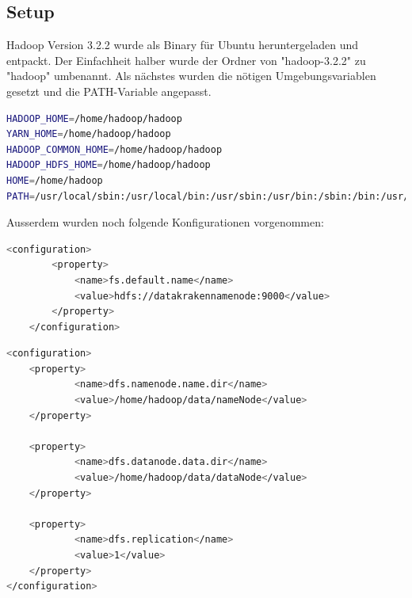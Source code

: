 \documentclass[12pt,oneside,a4paper,parskip]{scrbook}
\begin{document}
\subsection{Setup}
Hadoop Version 3.2.2 wurde als Binary für Ubuntu heruntergeladen und entpackt. Der Einfachheit halber wurde der Ordner von "hadoop-3.2.2" zu "hadoop" umbenannt.
Als nächstes wurden die nötigen Umgebungsvariablen gesetzt und die PATH-Variable angepasst. %
\begin{lstlisting}[caption=etc/environment,label=env,language=bash]
HADOOP_HOME=/home/hadoop/hadoop
YARN_HOME=/home/hadoop/hadoop
HADOOP_COMMON_HOME=/home/hadoop/hadoop
HADOOP_HDFS_HOME=/home/hadoop/hadoop
HOME=/home/hadoop
PATH=/usr/local/sbin:/usr/local/bin:/usr/sbin:/usr/bin:/sbin:/bin:/usr/games:/usr/local/games:/snap/bin:/bin:/home/hadoop/hadoop/bin:/home/hadoop/hadoop/sbin:/usr/lib/jvm/java-8-openjdk-amd64/bin:/usr/lib/jvm/java-8-openjdk-amd64/sbin
\end{lstlisting}
Ausserdem wurden noch folgende Konfigurationen vorgenommen: \newline
\begin{lstlisting}[caption=/hadoop/etc/hadoop/core-site.xml,label=coresitexml,language=bash]
<configuration>
        <property>
            <name>fs.default.name</name>
            <value>hdfs://datakrakennamenode:9000</value>
        </property>
    </configuration>
\end{lstlisting}
\begin{lstlisting}[caption=hadoop/etc/hadoop/hdfs-site.xml,label=hdfssitexml,language=bash]
<configuration>
    <property>
            <name>dfs.namenode.name.dir</name>
            <value>/home/hadoop/data/nameNode</value>
    </property>

    <property>
            <name>dfs.datanode.data.dir</name>
            <value>/home/hadoop/data/dataNode</value>
    </property>

    <property>
            <name>dfs.replication</name>
            <value>1</value>
    </property>
</configuration>
\end{lstlisting}
\end{document}
